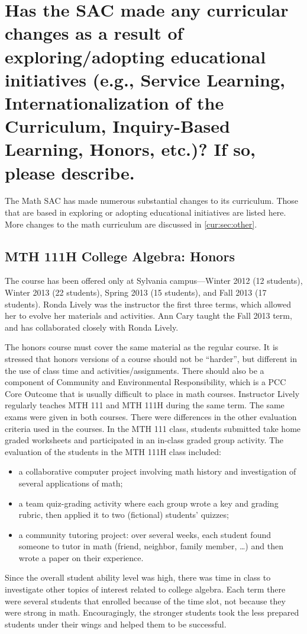 \section[Curricular changes resulting from educational initiatives]{Has the SAC
  made any curricular changes as a result of exploring/adopting educational
  initiatives (e.g., Service Learning, Internationalization of the Curriculum,
  Inquiry-Based Learning, Honors, etc.)?
  If so, please describe.
 }\label{cur:sec:curchange}

The Math SAC has made numerous substantial changes to its curriculum.
Those that are based in exploring or adopting educational initiatives are listed here.
More changes to the math curriculum are discussed in \vref{cur:sec:other}.

\subsection{MTH 111H College Algebra: Honors}\label{cur:sub:111H}

The course has been offered only at Sylvania campus---Winter 2012 (12 students), Winter 2013 (22 students), Spring 2013 (15 students), and Fall 2013 (17 students).
Ronda Lively was the instructor the first three terms, which allowed her to evolve her materials and activities.
Ann Cary taught the Fall 2013 term, and has collaborated closely with Ronda Lively.

The honors course must cover the same material as the regular course.
It is stressed that honors versions of a course should not be ``harder'', but different in the use of class time and activities/assignments.
There should also be a component of Community and Environmental Responsibility, which is a PCC Core Outcome that is usually difficult to place in math courses.
Instructor Lively regularly teaches MTH 111 and MTH 111H during the same term.
The same exams were given in both courses.
There were differences in the other evaluation criteria used in the courses.
In the MTH 111 class, students submitted take home graded worksheets and participated in an in-class graded group activity.
The evaluation of the students in the MTH 111H class included: \begin{itemize} \item a collaborative computer project involving math history and investigation of several applications of math; \item a team quiz-grading activity where each group wrote a key and grading rubric, then applied it to two (fictional) students' quizzes; \item a community tutoring project:  over several weeks, each student found someone to tutor in math (friend, neighbor, family member, \ldots) and then wrote a paper on their experience.
\end{itemize}
Since the overall student ability level was high, there was time in class to investigate other topics of interest related to college algebra.
Each term there were several students that enrolled because of the time slot, not because they were strong in math.
Encouragingly, the stronger students took the less prepared students under their wings and helped them to be successful.

